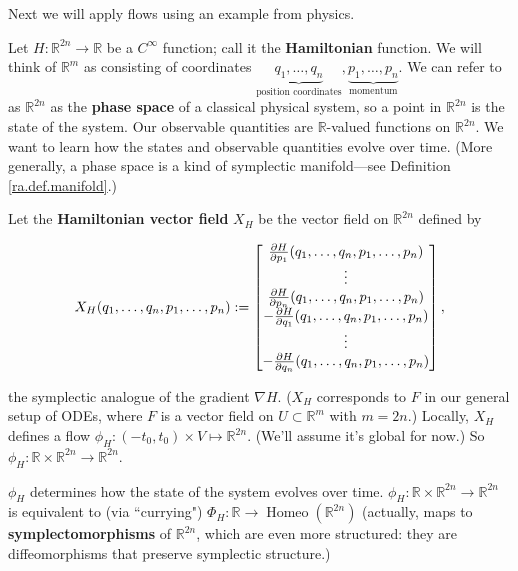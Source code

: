 Next we will apply flows using an example from physics.

\begin{example}

Let \(H: \mathbb{R}^{2n} \to \mathbb{R}\) be a \(C^\infty\) function; call it the \textbf{Hamiltonian} function. We will think of \(\mathbb{R}^m\) as consisting of coordinates \(\underbrace{q_1, \ldots, q_n}_{\text{position coordinates}}, \underbrace{p_1, \ldots, p_n}_{\text{momentum}}\). We can refer to as \(\mathbb{R}^{2n}\) as the \textbf{phase space} of a classical physical system, so a point in \(\mathbb{R}^{2n}\) is the state of the system. Our observable quantities are \(\mathbb{R}\)-valued functions on \(\mathbb{R}^{2n}\). We want to learn how the states and observable quantities evolve over time. (More generally, a phase space is a kind of symplectic manifold---see Definition \ref{ra.def.manifold}.) 

Let the \textbf{Hamiltonian vector field} \(X_H\) be the vector field on \(\mathbb{R}^{2n}\) defined by 

\[
X_H(q_1, \ldots, q_n, p_1, \ldots, p_n) := \begin{bmatrix}
\pderiv{H}{p_1}(q_1, \ldots, q_n, p_1, \ldots, p_n) \\
\vdots \\
\pderiv{H}{p_n} (q_1, \ldots, q_n, p_1, \ldots, p_n) \\
-\pderiv{H}{q_1}(q_1, \ldots, q_n, p_1, \ldots, p_n) \\
\vdots \\
-\pderiv{H}{q_n} (q_1, \ldots, q_n, p_1, \ldots, p_n) \\
\end{bmatrix},
\]

the symplectic analogue of the gradient \(\nabla H\). (\(X_H\) corresponds to \(F\) in our general setup of ODEs, where \(F\) is a vector field on \(U \subset \mathbb{R}^m\) with \(m= 2n\).) Locally, \(X_H\) defines a flow \(\phi_H: (-t_0, t_0) \times V \mapsto \mathbb{R}^{2n}\). (We'll assume it's global for now.) So \(\phi_H: \mathbb{R} \times \mathbb{R}^{2n} \to \mathbb{R}^{2n}\). 

\begin{theorem}

\(\phi_H\) determines how the state of the system evolves over time. \(\phi_H: \mathbb{R} \times \mathbb{R}^{2n} \to \mathbb{R}^{2n}\) is equivalent to (via ``currying") \(\Phi_H : \mathbb{R} \to \operatorname{Homeo}(\mathbb{R}^{2n})\) (actually, maps to \textbf{symplectomorphisms} of \(\mathbb{R}^{2n}\), which are even more structured: they are diffeomorphisms that preserve symplectic structure.)

\end{theorem}


\end{example}



